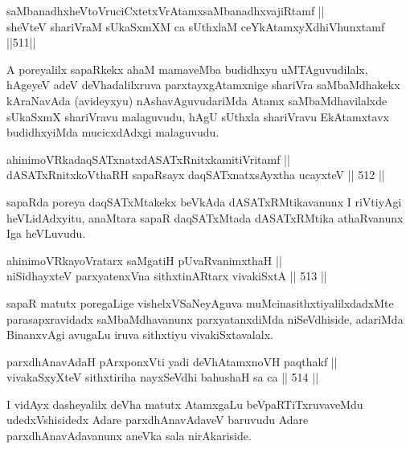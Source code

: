 \begin{shl}
saMbanadhxheVtoVruciCxtetxVrAtamxsaMbanadhxvajiRtamf || \\
sheVteV shariVraM sUkaSxmXM ca sUthxlaM ceYkAtamxyXdhiVhunxtamf \hfill ||511||  
\end{shl}

\begin{artha}
A poreyalilx sapaRkekx ahaM mamaveMba budidhxyu uMTAguvudilalx,
hAgeyeV adeV deVhadalilxruva parxtayxgAtamxnige shariVra saMbaMdhakekx
kAraNavAda (avideyxyu) nAshavAguvudariMda Atamx saMbaMdhavilalxde
sUkaSxmX shariVravu malaguvudu, hAgU sUthxla shariVravu EkAtamxtavx
budidhxyiMda mucicxdAdxgi malaguvudu.
\end{artha}

\begin{shl}
ahinimoVRkadaqSATxnatxdASATxRnitxkamitiVritamf ||  \\
dASATxRnitxkoV\s thaRH sapaRsayx daqSATxnatxsAyxtha ucayxteV \hfill || 512 ||  
\end{shl}

\begin{artha}
sapaRda poreya daqSATxMtakekx beVkAda dASATxRMtikavanunx I riVtiyAgi
heVLidAdxyitu, anaMtara sapaR daqSATxMtada dASATxRMtika athaRvanunx
Iga heVLuvudu.
\end{artha}


\begin{shl}
ahinimoVRkayoVratarx saMgatiH pUvaRvanimxthaH || \\
niSidhayxteV parxyatenxVna sithxtinARtarx vivakiSxtA \hfill || 513 ||  
\end{shl}

\begin{artha}
sapaR matutx poregaLige vishelxVSaNeyAguva muMcinasithxti\-\break yalilxdadxMte
parasapxravidadx saMbaMdhavanunx parxyatanxdiMda niSeVdhiside,
adariMda BinanxvAgi avugaLu iruva sithxtiyu vivakiSxtavalalx.
\end{artha}

\begin{shl}
parxdhAnavAdaH pArxponxVti yadi deVhAtamxnoVH paqthakf || \\
vivakaSxyXteV sithxtiriha nayxSeVdhi bahushaH sa ca \hfill || 514 ||  
\end{shl}

\begin{artha}
I vidAyx dasheyalilx deVha matutx AtamxgaLu beVpaRTiTxruvaveMdu
udedxVshisidedx Adare parxdhAnavAdaveV baruvudu Adare
parxdhAnavAdavanunx aneVka sala nirAkariside.
\end{artha}

